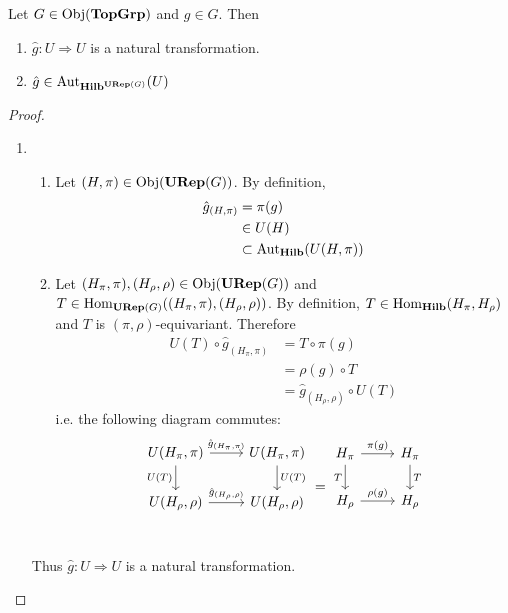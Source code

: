 \documentclass{book}
\begin{document}
	\begin{ex}
		Let $G \in \operatorname{Obj}(\operatorname*{\text{\textbf{TopGrp}}})$ and $g \in G$. Then 
		\begin{enumerate}
			\item $\hat{g}: U \Rightarrow U$ is a natural transformation.
			\item $\hat{g} \in \operatorname{Aut}_{\operatorname*{\text{\textbf{Hilb}}}^{\operatorname*{\text{\textbf{URep}}}(G)}}(U)$
		\end{enumerate}
	\end{ex}

	\begin{proof}\
		\begin{enumerate}
			\item \begin{enumerate}
				\item Let $(H, \pi) \in \operatorname{Obj}(\operatorname*{\text{\textbf{URep}}}(G))$. By definition,  
				\begin{align*}
					\hat{g}_{(H, \pi)}
					& = \pi(g) \\
					& \in U(H) \\
					& \subset \operatorname{Aut}_{\operatorname*{\text{\textbf{Hilb}}}}(U(H, \pi))
				\end{align*}
				\item Let $(H_{\pi}, \pi), (H_{\rho}, \rho) \in \operatorname{Obj}(\operatorname*{\text{\textbf{URep}}}(G))$ and $T \in \operatorname{Hom}_{\operatorname*{\text{\textbf{URep}}}(G)}((H_{\pi}, \pi), (H_{\rho}, \rho))$. By definition, $T \in \operatorname{Hom}_{\operatorname*{\text{\textbf{Hilb}}}}(H_{\pi}, H_{\rho})$ and $T$ is $(\pi, \rho)$-equivariant. Therefore
				\begin{align*}
					U(T) \circ \hat{g}_{(H_{\pi}, \pi)}
					& = T \circ \pi(g) \\
					& = \rho(g) \circ T \\
					& = \hat{g}_{(H_{\rho}, \rho)} \circ U(T) 
				\end{align*}
				i.e. the following diagram commutes: 
				\[ 
				\begin{tikzcd}
					U(H_{\pi}, \pi)  \arrow[r, "\hat{g}_{(H_{\pi} ,\pi)}"]  \arrow[d, "U(T)"']  & U(H_{\pi}, \pi)   \arrow[d, "U(T)"]\\
					U(H_{\rho}, \rho) \arrow[r, "\hat{g}_{(H_{\rho}, \rho)}"] &  U(H_{\rho}, \rho) \\
				\end{tikzcd}
				= 
				\begin{tikzcd}
					H_{\pi}  \arrow[r, "\pi(g)"]  \arrow[d, "T"']  & H_{\pi}   \arrow[d, "T"]\\
					H_{\rho} \arrow[r, "\rho(g)"] &  H_{\rho} \\
				\end{tikzcd}
				\]
			\end{enumerate}
			Thus $\hat{g}: U \Rightarrow U$ is a natural transformation. 

\end{enumerate}
\end{proof}
\end{document}
